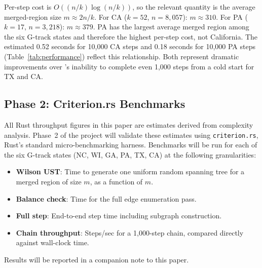 Per-step cost is $O((n/k)\log(n/k))$, so the relevant quantity is the
average merged-region size $m \approx 2n/k$.
For CA ($k=52$, $n=8{,}057$): $m \approx 310$.
For PA ($k=17$, $n=3{,}218$): $m \approx 379$.
PA has the largest average merged region among the six G-track states
and therefore the highest per-step cost, not California.
The estimated 0.52 seconds for 10{,}000 CA steps and 0.18 seconds for
10{,}000 PA steps (Table~\ref{tab:performance}) reflect this relationship.
Both represent dramatic improvements over \gc{}'s inability to complete
even 1{,}000 steps from a cold start for TX and CA.

\subsection{Phase 2: Criterion.rs Benchmarks}
\label{ssec:phase2}

All Rust throughput figures in this paper are estimates derived from
complexity analysis.
Phase~2 of the \re{} project will validate these estimates using
\texttt{criterion.rs}, Rust's standard micro-benchmarking harness.
Benchmarks will be run for each of the six G-track states (NC, WI, GA,
PA, TX, CA) at the following granularities:

\begin{itemize}
  \item \textbf{Wilson UST}: Time to generate one uniform random spanning
    tree for a merged region of size $m$, as a function of $m$.
  \item \textbf{Balance check}: Time for the full edge enumeration pass.
  \item \textbf{Full step}: End-to-end \recom{} step time including
    subgraph construction.
  \item \textbf{Chain throughput}: Steps/sec for a 1{,}000-step chain,
    compared directly against \gc{} wall-clock time.
\end{itemize}

Results will be reported in a companion note to this paper.
